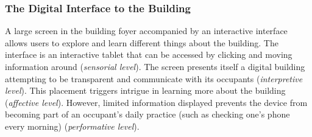 \documentclass[manuscript, anonymous, review]{acmart}
\begin{document}
\subsubsection*{The Digital Interface to the Building}
A large screen in the building foyer accompanied by an interactive interface allows users to explore and learn different things about the building. The interface is an interactive tablet that can be accessed by clicking and moving information around (\textit{sensorial level}). The screen presents itself a digital building attempting to be transparent and communicate with its occupants (\textit{interpretive level}). This placement triggers intrigue in learning more about the building (\textit{affective level}). However, limited information displayed prevents the device from becoming part of an occupant's daily practice (such as checking one's phone every morning) (\textit{performative level}). 

\end{document}
